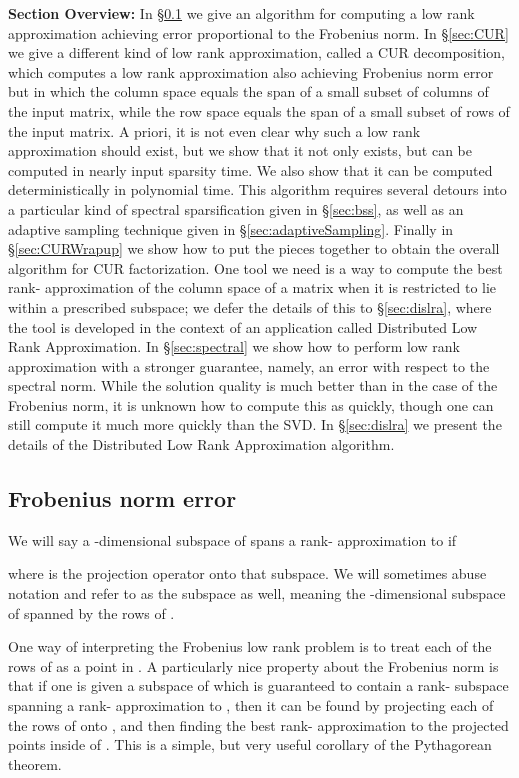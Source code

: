 \documentclass[11pt]{article}
\begin{document}
{\bf Section Overview:} In \S\ref{sec:frobenius} we give an algorithm for computing a low rank approximation achieving error proportional to the Frobenius norm. In \S\ref{sec:CUR} we give a different kind of low rank approximation, called a CUR decomposition, which computes a low rank approximation also achieving Frobenius norm error but in which the column space equals the span of a small subset of columns of the input matrix, while the row space equals the span of a small subset of rows of the input matrix. A priori, it is not even clear why such a low rank approximation should exist, but we show that it not only exists, but can be computed in nearly input sparsity time. We also show that it can be computed deterministically in polynomial time. This algorithm requires several detours into a particular kind of spectral sparsification given in \S\ref{sec:bss}, as well as an adaptive sampling technique given in \S\ref{sec:adaptiveSampling}. Finally in \S\ref{sec:CURWrapup} we show how to put the pieces together to obtain the overall algorithm for CUR factorization. One tool we need is a way to compute the best rank- approximation of the column space of a matrix when it is restricted to lie within a prescribed subspace; we defer the details of this to \S\ref{sec:dislra}, where the tool is developed in the context of an application called Distributed Low Rank Approximation. In \S\ref{sec:spectral} we show how to perform low rank approximation with a stronger guarantee, namely, an error with respect to the spectral norm. While the solution quality is much better than in the case of the Frobenius norm, it is unknown how to compute this as quickly, though one can still compute it much more quickly than the SVD. In \S\ref{sec:dislra} we present the details of the Distributed Low Rank Approximation algorithm.

\subsection{Frobenius norm error}\label{sec:frobenius}
We will say a -dimensional subspace of  spans a 
 rank- approximation to  if 

where  is the projection operator onto that subspace. We will
sometimes abuse notation and refer to  as the subspace as well,
meaning the -dimensional subspace of  spanned
by the rows of . 

One way of interpreting the Frobenius low rank problem is to treat each
of the  rows of  as a point in . A 
particularly nice property about the Frobenius norm is that if one is given
a subspace  of  which is guaranteed to contain a
rank- subspace  spanning a  rank-
approximation to , then it can be found by projecting each of the
rows of  onto , and then finding the best rank- approximation
to the projected points inside of . This is a simple, but very useful
corollary of the Pythagorean theorem.
\end{document}
